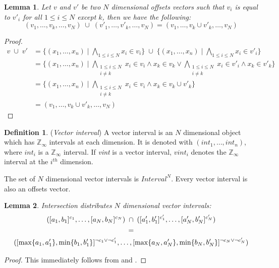 \documentclass{article}
\theoremstyle{definition}
\newtheorem{defn}{Definition}
\theoremstyle{plain}
\newtheorem{lem}{Lemma}
\newcommand{\zinf}{\textnormal{$\mathbb{Z}_\infty$}}
\newcommand{\interv}[3]{\textnormal{$\lbrack#1,#2\rbrack^{#3}$}}
\begin{document}
\begin{lem}{}
  Let $v$ and $v'$ be two $N$ dimensional offsets vectors such that $v_i$ is
  equal to $v'_i$ for all $1 \leq i \leq N$ except $k$, then we have the
  following:
%
  \begin{equation*}
    (v_1,\dotsc, v_k,\dotsc, v_N) \; \cup \; (v'_1,\dotsc, v'_k, \dotsc, v_N)
    =
    (v_1,\dotsc, v_k \cup v'_k,\dotsc, v_N)
  \end{equation*}\label{lem:vector-union}
\end{lem}
%
\begin{proof}
  \begin{align*}
    v \; \cup \; v' &
    = \{(x_1,\dotsc,x_n) \mid
          \bigwedge_{1 \leq i \leq N } x_i \in v_i \}
      \;\cup\;
      \{(x_1,\dotsc,x_n) \mid
          \bigwedge_{1 \leq i \leq N } x_i \in v'_i \} \\
    & = \{(x_1,\dotsc,x_n) \mid
          \bigwedge_{\substack{1 \leq i \leq N \\ i \neq k}} x_i \in v_i
              \wedge x_k \in v_k \vee
          \bigwedge_{\substack{1 \leq i \leq N \\ i \neq k}} x_i \in v'_i
            \wedge x_k \in v'_k
        \} \\
    & = \{(x_1,\dotsc,x_n) \mid
          \bigwedge_{\substack{1 \leq i \leq N \\ i \neq k}} x_i \in v_i
          \wedge x_k \in v_k \cup v'_k
        \} \\
    & = (v_1,\dotsc, v_k \cup v'_k,\dotsc, v_N)
  \end{align*}
\end{proof}

\begin{defn}{(\emph{Vector interval})}
  A vector interval is an $N$ dimensional object which has \zinf{} intervals at
  each dimension. It is denoted with $(\textit{int}_1, \dots, \textit{int}_n)$,
  where $\textit{int}_i$ is a \zinf{} interval. If \textit{vint} is a vector
  interval, $\textit{vint}_i$ denotes the \zinf{} interval at the $i^{th}$
  dimension.

  The set of $N$ dimensional vector intervals is $\textit{Interval}^N$. Every
  vector interval is also an offsets vector.
\end{defn}

\begin{lem}{}
  Intersection distributes $N$ dimensional vector intervals:
%
  \begin{gather*}
    (\interv{a_1}{b_1}{c_1}, \dots, \interv{a_N}{b_N}{c_N}) \; \cap \;
      (\interv{a'_1}{b'_1}{c'_1}, \dots, \interv{a'_N}{b'_N}{c'_N}) \\
    = \\
    (\interv{\max \{a_1,a'_1\}}{\min \{b_1,b'_1\}}{\neg c_1 \vee \neg c'_1},
      \dots, \interv{\max \{a_N,a'_N\}}{\min \{b_N,b'_N\}}{\neg c_N \vee \neg c'_N})
  \end{gather*}
\end{lem}
%
\begin{proof}
  This immediately follows from  and
  .
\end{proof}
\end{document}

